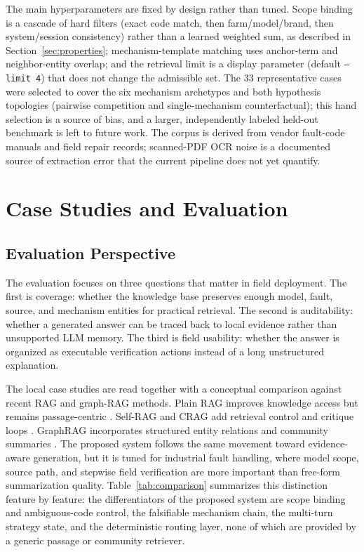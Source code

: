 \documentclass[lettersize,journal]{IEEEtran}
\begin{document}
The main hyperparameters are fixed by design rather than tuned. Scope binding is a cascade of hard filters (exact code match, then farm/model/brand, then system/session consistency) rather than a learned weighted sum, as described in Section~\ref{sec:properties}; mechanism-template matching uses anchor-term and neighbor-entity overlap; and the retrieval limit is a display parameter (default \texttt{--limit 4}) that does not change the admissible set. The 33 representative cases were selected to cover the six mechanism archetypes and both hypothesis topologies (pairwise competition and single-mechanism counterfactual); this hand selection is a source of bias, and a larger, independently labeled held-out benchmark is left to future work. The corpus is derived from vendor fault-code manuals and field repair records; scanned-PDF OCR noise is a documented source of extraction error that the current pipeline does not yet quantify.

\section{Case Studies and Evaluation}
\subsection{Evaluation Perspective}
The evaluation focuses on three questions that matter in field deployment. The first is coverage: whether the knowledge base preserves enough model, fault, source, and mechanism entities for practical retrieval. The second is auditability: whether a generated answer can be traced back to local evidence rather than unsupported LLM memory. The third is field usability: whether the answer is organized as executable verification actions instead of a long unstructured explanation.

The local case studies are read together with a conceptual comparison against recent RAG and graph-RAG methods. Plain RAG improves knowledge access but remains passage-centric \cite{lewis2020rag,zhao2024ragSurvey}. Self-RAG and CRAG add retrieval control and critique loops \cite{asai2023selfrag,yan2024crag}. GraphRAG incorporates structured entity relations and community summaries \cite{edge2024graphrag}. The proposed system follows the same movement toward evidence-aware generation, but it is tuned for industrial fault handling, where model scope, source path, and stepwise field verification are more important than free-form summarization quality. Table~\ref{tab:comparison} summarizes this distinction feature by feature: the differentiators of the proposed system are scope binding and ambiguous-code control, the falsifiable mechanism chain, the multi-turn strategy state, and the deterministic routing layer, none of which are provided by a generic passage or community retriever.
\end{document}
